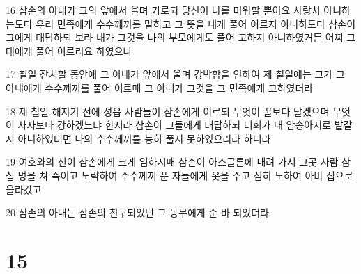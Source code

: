 \par 16 삼손의 아내가 그의 앞에서 울며 가로되 당신이 나를 미워할 뿐이요 사랑치 아니하는도다 우리 민족에게 수수께끼를 말하고 그 뜻을 내게 풀어 이르지 아니하도다 삼손이 그에게 대답하되 보라 내가 그것을 나의 부모에게도 풀어 고하지 아니하였거든 어찌 그대에게 풀어 이르리요 하였으나
\par 17 칠일 잔치할 동안에 그 아내가 앞에서 울며 강박함을 인하여 제 칠일에는 그가 그 아내에게 수수께끼를 풀어 이르매 그 아내가 그것을 그 민족에게 고하였더라
\par 18 제 칠일 해지기 전에 성읍 사람들이 삼손에게 이르되 무엇이 꿀보다 달겠으며 무엇이 사자보다 강하겠느냐 한지라 삼손이 그들에게 대답하되 너희가 내 암송아지로 밭갈지 아니하였더면 나의 수수께끼를 능히 풀지 못하였으리라 하니라
\par 19 여호와의 신이 삼손에게 크게 임하시매 삼손이 아스글론에 내려 가서 그곳 사람 삼십 명을 쳐 죽이고 노략하여 수수께끼 푼 자들에게 옷을 주고 심히 노하여 아비 집으로 올라갔고
\par 20 삼손의 아내는 삼손의 친구되었던 그 동무에게 준 바 되었더라

\chapter{15}

